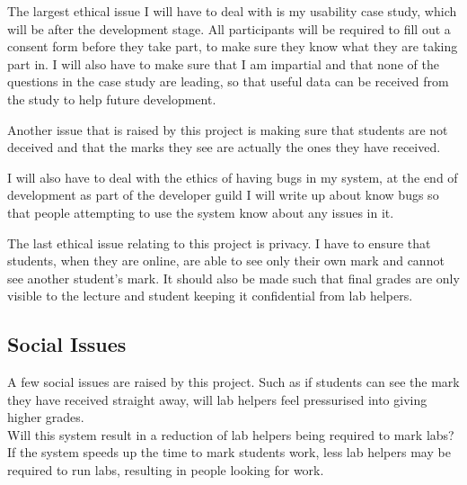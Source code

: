 \documentclass[12pt]{article}  %
\begin{document}
The largest ethical issue I will have to deal with is my usability case study, which will be after the development stage. All participants will be required to fill out a consent form before they take part, to make sure they know what they are taking part in. I will also have to make sure that I am impartial and that none of the questions in the case study are leading, so that useful data can be received from the study to help future development.

Another issue that is raised by this project is making sure that students are not deceived and that the marks they see are actually the ones they have received.

I will also have to deal with the ethics of having bugs in my system, at the end of development as part of the developer guild I will write up about know bugs so that people attempting to use the system know about any issues in it.

The last ethical issue relating to this project is privacy. I have to  ensure that students, when they are online, are able to see only their own mark and cannot see another student's mark. It should also be made such that final grades are only visible to the lecture and student keeping it confidential from lab helpers.




\subsection{Social Issues}
A few social issues are raised by this project. Such as if students can see the mark they have received straight away, will lab helpers feel pressurised into giving higher grades.\\
Will this system result in a reduction of lab helpers being required to mark labs? If the system speeds up the time to mark students work, less lab helpers may be required to run labs, resulting in people looking for work.





\newpage
\printbibliography[heading=bibintoc]
\let\cleardoublepage\clearpage


\end{document}
